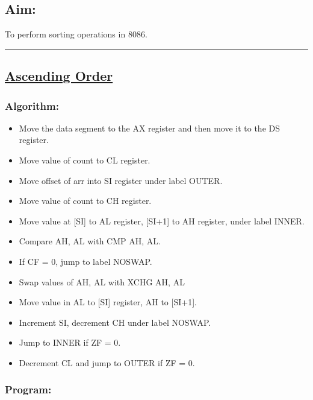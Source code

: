 \documentclass[10pt,a4paper]{article}
\begin{document}
\begin{flushleft}
\subsection*{\textbf{Aim:}} 
To perform sorting operations in 8086.

\vspace{1cm}
\hrule
\subsection*{\textbf{\underline{Ascending Order}}}

\subsubsection*{\textbf{Algorithm:}}
\begin{itemize}
    \item Move the data segment to the AX register and then move it to the DS register.
    \item Move value of count to CL register.
    \item Move offset of arr into SI register under label OUTER.
    \item Move value of count to CH register.
    \item Move value at [SI] to AL register, [SI+1] to AH register, under label INNER.
    \item Compare AH, AL with CMP AH, AL.
    \item If CF = 0, jump to label NOSWAP. 
    \item Swap values of AH, AL with XCHG AH, AL
    \item Move value in AL to [SI] register, AH to [SI+1].
    \item Increment SI, decrement CH under label NOSWAP.
    \item Jump to INNER if ZF = 0.
    \item Decrement CL and jump to OUTER if ZF = 0.
\end{itemize}

\newpage
\subsubsection*{\textbf{Program:}}


\end{flushleft}
\end{document}
